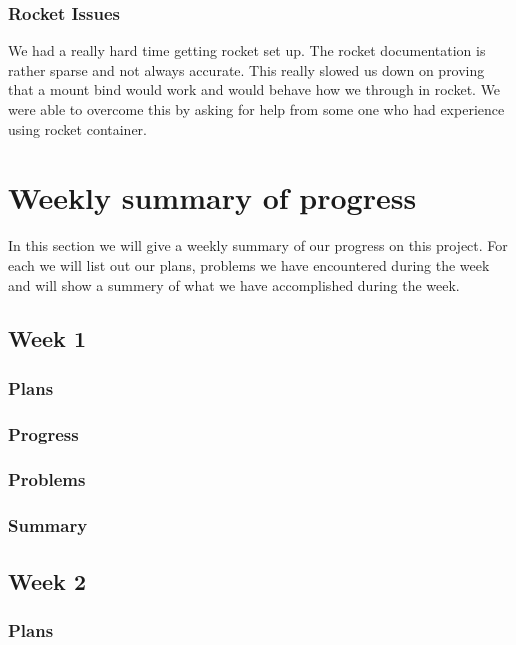 \documentclass[onecolumn, draftclsnofoot,10pt, compsoc]{article}
\begin{document}
			\subsubsection{Rocket Issues} We had a really hard time getting rocket set up. The rocket documentation is rather sparse and not always accurate. This really slowed us down on proving that a mount bind would work and would behave how we through in rocket. We were able to overcome this by asking for help from some one who had experience using rocket container.\\


\section{Weekly summary of progress}
	   In this section we will give a weekly summary of our progress on this project. For each we will list out our plans, problems we have encountered during the week and will show a summery of what we have accomplished during the week.\\
		
		\subsection{Week 1}
			\subsubsection{Plans}
			
			\subsubsection{Progress}
			
			\subsubsection{Problems}
			
			\subsubsection{Summary}
			
		\subsection{Week 2}
				\subsubsection{Plans}
			
\end{document}
